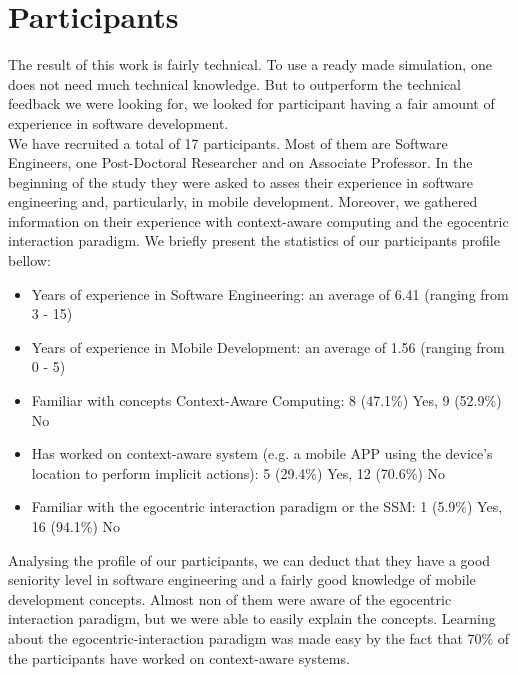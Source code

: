 \section{Participants} %
\label{sec:eval_participants}
The result of this work is fairly technical. To use a ready made simulation, one does not need much technical knowledge. But to outperform the technical feedback we were looking for, we looked for participant having a fair amount of experience in software development.\\

We have recruited a total of 17 participants. Most of them are Software Engineers, one Post-Doctoral Researcher and on Associate Professor. In the beginning of the study they were asked to asses their experience in software engineering and, particularly, in mobile development. Moreover, we gathered information on their experience with context-aware computing and the egocentric interaction paradigm. We briefly present the statistics of our participants profile bellow:
\begin{itemize}
	\item Years of experience in Software Engineering: an average of 6.41 (ranging from 3 - 15)
	\item Years of experience in Mobile Development: an average of 1.56 (ranging from 0 - 5)
	\item Familiar with concepts Context-Aware Computing: 8 (47.1\%) Yes, 9 (52.9\%) No
	\item Has worked on context-aware system (e.g. a mobile APP using the device's location to perform implicit actions): 5 (29.4\%) Yes, 12 (70.6\%) No
	\item Familiar with the egocentric interaction paradigm or the SSM: 1 (5.9\%) Yes, 16 (94.1\%) No
\end{itemize}

Analysing the profile of our participants, we can deduct that they have a good seniority level in software engineering and a fairly good knowledge of mobile development concepts. Almost non of them were aware of the egocentric interaction paradigm, but we were able to easily explain the concepts. Learning about the egocentric-interaction paradigm was made easy by the fact that 70\% of the participants have worked on context-aware systems.

